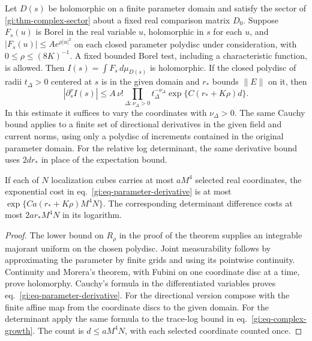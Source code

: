 \documentclass[11pt,letterpaper,reqno]{amsart}
\makeatletter
\numberwithin{equation}{section}
\renewcommand{\eqref}[1]{\textup{eq.~\ref{#1}}}
\theoremstyle{definition}
\newcommand{\ms@majorstart}{%
  \pushQED{\qed}\renewcommand{\qedsymbol}{$\blacksquare\square$}}
\newenvironment{corollary}[1][]{\ms@majorstart\ms@corollary[#1]}
  {\popQED\endms@corollary}
\theoremstyle{remark}
\makeatother
\begin{document}
\begin{corollary}[Parameters and localization cost]
\label{gi:cor-complex-parameters}
Let \(D(s)\) be holomorphic on a finite parameter domain and
satisfy the sector of \cref{gi:thm-complex-sector} about a fixed
real comparison matrix \(D_0\). Suppose \(F_s(u)\) is Borel in
the real variable \(u\), holomorphic in \(s\) for each \(u\), and
\(|F_s(u)|\le A e^{\rho |u|^2}\) on each closed parameter polydisc
under consideration, with \(0\le\rho\le(8K)^{-1}\).
A fixed bounded Borel test, including a characteristic function,
is allowed. Then \(I(s)=\int F_s\,d\mu_{D(s)}\) is holomorphic.
If the closed polydisc of radii \(t_\Delta>0\) centered at \(s\)
is in the given domain and \(r_*\) bounds \(\|E\|\) on it, then
\begin{equation}\label{gi:eq-parameter-derivative}
 |\partial_s^\nu I(s)|
 \le A\,\nu!\prod_{\Delta:\nu_\Delta>0}t_\Delta^{-\nu_\Delta}
                     \exp\{C(r_*+K\rho)d\}.
\end{equation}
In this estimate it suffices to vary the coordinates with
\(\nu_\Delta>0\). The same Cauchy bound applies to a finite set of
directional derivatives in the given field and current norms,
using only a polydisc of increments contained in the original
parameter domain. For the relative log determinant, the
same derivative bound uses \(2dr_*\) in place of the
expectation bound.

If each of \(N\) localization cubes carries at most \(aM^4\)
selected real coordinates, the exponential cost in
\eqref{gi:eq-parameter-derivative} is at most
\(\exp\{Ca(r_*+K\rho)M^4N\}\).
The corresponding determinant difference costs at most
\(2ar_*M^4N\) in its logarithm.
\end{corollary}

\begin{proof}
The lower bound on \(R_\rho\) in the proof of the theorem supplies
an integrable majorant uniform on the chosen polydisc.
Joint measurability follows by approximating the parameter by
finite grids and using its pointwise continuity.
Continuity and Morera's theorem, with Fubini on one coordinate
disc at a time, prove holomorphy. Cauchy's formula in the
differentiated variables proves \eqref{gi:eq-parameter-derivative}.
For the directional version compose with the finite affine map
from the coordinate discs to the given domain. For the determinant
apply the same formula to the trace-log bound in
\eqref{gi:eq-complex-growth}. The count is
\(d\le aM^4N\), with each selected coordinate counted once.
\end{proof}
\end{document}
